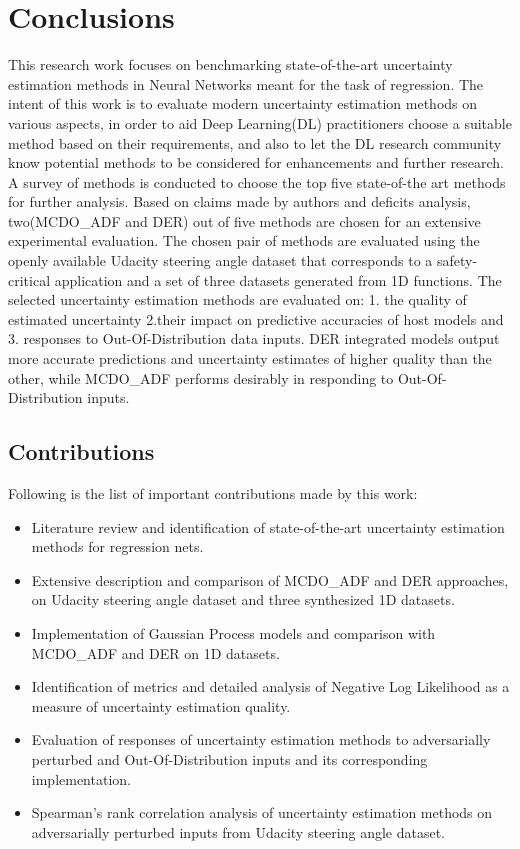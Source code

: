 

    \chapter{Conclusions}
	This research work focuses on benchmarking state-of-the-art uncertainty estimation methods in Neural Networks meant for the task of regression. The intent of this work is to evaluate modern uncertainty estimation methods on various aspects, in order to aid Deep Learning(DL) practitioners choose a suitable method based on their requirements, and also to let the DL research community know potential methods to be considered for enhancements and further research. A survey of methods is conducted to choose the top five state-of-the art methods for further analysis. Based on claims made by authors and deficits analysis, two(MCDO\_ADF and DER) out of five methods are chosen for an extensive experimental evaluation. The chosen pair of methods are evaluated using the openly available Udacity steering angle dataset that corresponds to a safety-critical application and a set of three datasets generated from 1D functions. The selected uncertainty estimation methods are evaluated on: 1. the quality of estimated uncertainty 2.their impact on predictive accuracies of host models and 3. responses to Out-Of-Distribution data inputs. DER integrated models output more accurate predictions and uncertainty estimates of higher quality than the other, while MCDO\_ADF performs desirably in responding to Out-Of-Distribution inputs.
	
    \section{Contributions}
	Following is the list of important contributions made by this work:
	\begin{itemize}
		\item Literature review and identification of state-of-the-art uncertainty estimation methods for regression nets.
		\item Extensive description and comparison of MCDO\_ADF and DER approaches, on Udacity steering angle dataset and three synthesized 1D datasets.
		\item Implementation of Gaussian Process models and comparison with MCDO\_ADF and DER on 1D datasets.
		\item Identification of metrics and detailed analysis of Negative Log Likelihood as a measure of uncertainty estimation quality.
		\item Evaluation of responses of uncertainty estimation methods to adversarially perturbed and Out-Of-Distribution inputs and its corresponding implementation.
		\item Spearman's rank correlation analysis of uncertainty estimation methods on adversarially perturbed inputs from Udacity steering angle dataset.
	\end{itemize}
